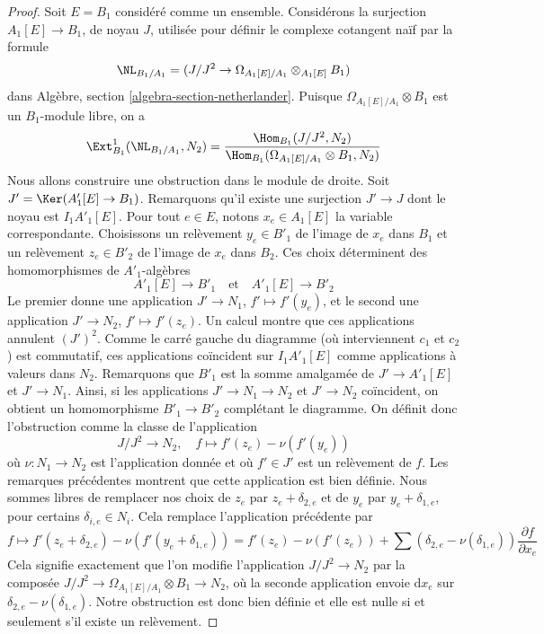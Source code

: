 \begin{proof}
Soit $E = B_1$ considéré comme un ensemble.
Considérons la surjection $A_1[E] \to B_1$, de noyau $J$, utilisée
pour définir le complexe cotangent naïf par la formule
$$
\NL_{B_1/A_1} = (J/J^2 \to \Omega_{A_1[E]/A_1} \otimes_{A_1[E]} B_1)
$$
dans
Algèbre, section \ref{algebra-section-netherlander}.
Puisque $\Omega_{A_1[E]/A_1} \otimes B_1$ est un
$B_1$-module libre, on a
$$
\Ext^1_{B_1}(\NL_{B_1/A_1}, N_2) =
\frac{\Hom_{B_1}(J/J^2, N_2)}
{\Hom_{B_1}(\Omega_{A_1[E]/A_1} \otimes B_1, N_2)}
$$
Nous allons construire une obstruction dans le module de droite.
Soit $J' = \Ker(A'_1[E] \to B_1)$. Remarquons qu'il existe une surjection
$J' \to J$ dont le noyau est $I_1A'_1[E]$.
Pour tout $e \in E$, notons $x_e \in A_1[E]$ la variable correspondante.
Choisissons un relèvement $y_e \in B'_1$ de l'image de $x_e$ dans $B_1$ et
un relèvement $z_e \in B'_2$ de l'image de $x_e$ dans $B_2$.
Ces choix déterminent des homomorphismes de $A'_1$-algèbres
$$
A'_1[E] \to B'_1 \quad\text{et}\quad A'_1[E] \to B'_2
$$
Le premier donne une application $J' \to N_1$, $f' \mapsto f'(y_e)$,
et le second une application $J' \to N_2$, $f' \mapsto f'(z_e)$.
Un calcul montre que ces applications annulent $(J')^2$.
Comme le carré gauche du diagramme (où interviennent $c_1$ et $c_2$)
est commutatif, ces applications coïncident sur $I_1A'_1[E]$ comme applications à valeurs dans $N_2$.
Remarquons que $B'_1$ est la somme amalgamée de $J' \to A'_1[E]$ et $J' \to N_1$.
Ainsi, si les applications $J' \to N_1 \to N_2$ et $J' \to N_2$ coïncident, on
obtient un homomorphisme $B'_1 \to B'_2$ complétant le diagramme.
On définit donc l'obstruction comme la classe de l'application
$$
J/J^2 \to N_2,\quad f \mapsto f'(z_e) - \nu(f'(y_e))
$$
où $\nu : N_1 \to N_2$ est l'application donnée et où $f' \in J'$
est un relèvement de $f$. Les remarques précédentes montrent que cette application est bien définie.
Nous sommes libres
de remplacer nos choix de $z_e$ par $z_e + \delta_{2, e}$
et de $y_e$ par $y_e + \delta_{1, e}$, pour certains $\delta_{i, e} \in N_i$.
Cela remplace l'application précédente par
$$
f \mapsto f'(z_e + \delta_{2, e}) - \nu(f'(y_e + \delta_{1, e})) =
f'(z_e) - \nu(f'(z_e)) +
\sum (\delta_{2, e} - \nu(\delta_{1, e}))\frac{\partial f}{\partial x_e}
$$
Cela signifie exactement que l'on modifie l'application $J/J^2 \to N_2$
par la composée $J/J^2 \to \Omega_{A_1[E]/A_1} \otimes B_1 \to N_2$,
où la seconde application envoie $\text{d}x_e$ sur
$\delta_{2, e} - \nu(\delta_{1, e})$. Notre obstruction est donc bien définie
et elle est nulle si et seulement s'il existe un relèvement.


\end{proof}
